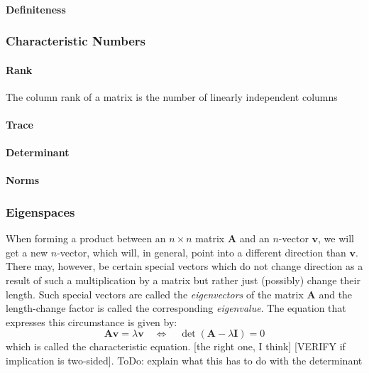 \paragraph{Definiteness}


\subsubsection{Characteristic Numbers}

\paragraph{Rank}
The column rank of a matrix is the number of linearly independent columns


\paragraph{Trace}



\paragraph{Determinant}

\paragraph{Norms}


\subsubsection{Eigenspaces}
When forming a product between an $n \times n$ matrix $\mathbf{A}$ and an $n$-vector $\mathbf{v}$, we will get a new $n$-vector, which will, in general, point into a different direction than  $\mathbf{v}$. There may, however, be certain special vectors which do not change direction as a result of such a multiplication by a matrix but rather just (possibly) change their length. Such special vectors are called the \emph{eigenvectors} of the matrix $\mathbf{A}$ and the length-change factor is called the corresponding \emph{eigenvalue}. The equation that expresses this circumstance is given by:
\begin{equation}
 \mathbf{A v} = \lambda \mathbf{v}  
 \quad \Leftrightarrow \quad
 \det ( \mathbf{A} - \lambda \mathbf{I} ) = 0
\end{equation}
which is called the characteristic equation. [the right one, I think]
[VERIFY if implication is two-sided]. ToDo: explain what this has to do with the determinant

